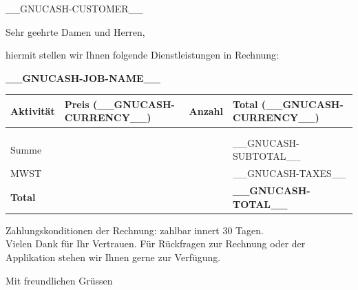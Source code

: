 \documentclass[a4paper, 12pt]{scrlttr2}
\newcommand{\amp}{&}
\newcommand{\printQuantity}[1]{
  \gclgetline{Quantity}{#1}%
  \ifthenelse{\equal{\gclgetline{Action}{#1}}{Hours}}{h}{}
  \ifthenelse{\equal{\gclgetline{Action}{#1}}{Material}}{Stk.}{}
}
\newcommand{\printDiscount}[1]{
  \gclgetline{Disc}{#1}%
  \ifthenelse{\equal{\gclgetline{DiscType}{#1}}{PERCENT}}{\%}{}
  \ifthenelse{\equal{\gclgetline{DiscType}{#1}}{VALUE}}{__GNUCASH-CURRENCY__}{}
}
\newcommand{\printline}[4]{
#1\amp#2\amp\hfill#3\amp#4\\
}
\newcounter{i}
\newcommand{\printtab}[1]{%
  \setcounter{i}{0}
  \whiledo {\value{i} < #1}{
    \printline{\gclgetline{Description}{\arabic{i}}}
              {\hfill\gclgetline{UnitPrice}{\arabic{i}}}
              {\printQuantity{\arabic{i}}}
              {\hfill\gclgetline{Subtotal}{\arabic{i}}}
    \stepcounter{i}
  }
}
\begin{document}
\begin{letter}{__GNUCASH-CUSTOMER__}
\opening{Sehr geehrte Damen und Herren,}

hiermit stellen wir Ihnen folgende Dienstleistungen in Rechnung:\\
\begin{center}
  {\bfseries \Large __GNUCASH-JOB-NAME__}
\end{center}
{\fontsize{11pt}{1.1em}\selectfont
\begin{tabularx}{\linewidth}{Xlll}
  \textbf{Aktivität} & \textbf{Preis (__GNUCASH-CURRENCY__)} & \textbf{Anzahl} & \textbf{Total (__GNUCASH-CURRENCY__)} \\\toprule
  \printtab{\csuse{gclinvoicelines}}\\[-2ex]
  \midrule
  Summe &&&\hfill__GNUCASH-SUBTOTAL__\\
  MWST &&&\hfill__GNUCASH-TAXES__\\
  \midrule
  \midrule
  \multicolumn{3}{l}{\textbf{Total}}&\hfill\textbf{__GNUCASH-TOTAL__}\\
\end{tabularx}
}

\enlargethispage{6\baselineskip}    

Zahlungskonditionen der Rechnung:  zahlbar innert 30 Tagen.\\

Vielen Dank für Ihr Vertrauen. Für Rückfragen zur Rechnung oder der Applikation stehen wir Ihnen gerne zur Verfügung.

\closing{Mit freundlichen Grüssen}

\end{letter}
\end{document}
